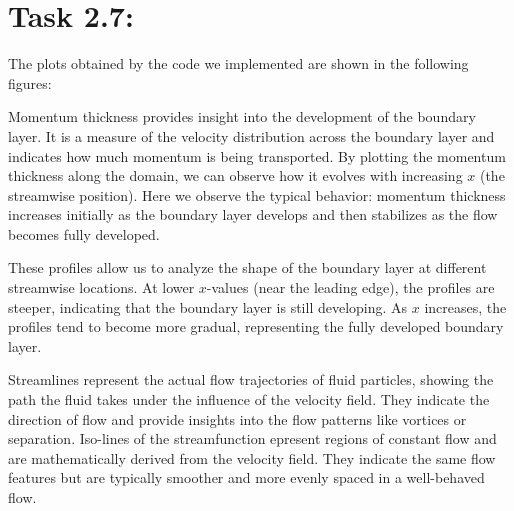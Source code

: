 \section*{\Large Task 2.7:}
The plots obtained by the code we implemented are shown in the following figures:
\begin{figure}[htbp]
\centering
{}
\hfill
{}
\label{fig:mieiduetrasparenti}
\end{figure}
Momentum thickness provides insight into the development of the boundary layer. It is a measure of the velocity distribution across the boundary layer and indicates how much momentum is being transported.
By plotting the momentum thickness along the domain, we can observe how it evolves with increasing $x$ (the streamwise position). Here we observe the typical behavior: momentum thickness increases initially as the boundary layer develops and then stabilizes as the flow becomes fully developed.

These profiles allow us to analyze the shape of the boundary layer at different streamwise locations. At lower $x$-values (near the leading edge), the profiles are steeper, indicating that the boundary layer is still developing.
As $x$ increases, the profiles tend to become more gradual, representing the fully developed boundary layer.

Streamlines represent the actual flow trajectories of fluid particles, showing the path the fluid takes under the influence of the velocity field. They indicate the direction of flow and provide insights into the flow patterns like vortices or separation.
Iso-lines of the streamfunction epresent regions of constant flow and are mathematically derived from the velocity field. They indicate the same flow features but are typically smoother and more evenly spaced in a well-behaved flow.

